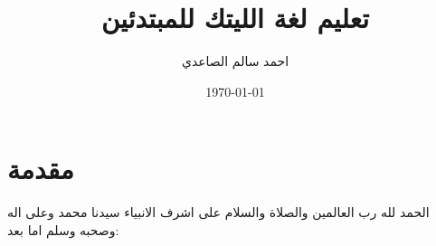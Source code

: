\documentclass{article}
\begin{document}
\title{تعليم لغة الليتك للمبتدئين}
\author{احمد سالم الصاعدي}
\date{\today}
\maketitle
\section{مقدمة}

الحمد لله رب العالمين والصلاة والسلام على اشرف الانبياء سيدنا محمد وعلى اله وصحبه وسلم اما بعد:
\end{document}
